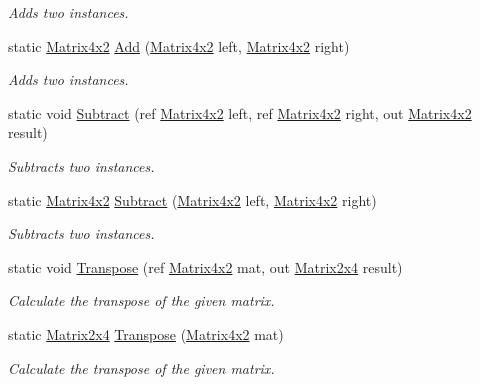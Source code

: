 \begin{DoxyCompactItemize}
\begin{DoxyCompactList}\small\item\em Adds two instances. \end{DoxyCompactList}\item 
static \hyperlink{struct_open_t_k_1_1_matrix4x2}{Matrix4x2} \hyperlink{struct_open_t_k_1_1_matrix4x2_a1446111d28a6e7fec022a92cfb93f389}{Add} (\hyperlink{struct_open_t_k_1_1_matrix4x2}{Matrix4x2} left, \hyperlink{struct_open_t_k_1_1_matrix4x2}{Matrix4x2} right)
\begin{DoxyCompactList}\small\item\em Adds two instances. \end{DoxyCompactList}\item 
static void \hyperlink{struct_open_t_k_1_1_matrix4x2_a610985af3ac0f9cb9de19e73329a9652}{Subtract} (ref \hyperlink{struct_open_t_k_1_1_matrix4x2}{Matrix4x2} left, ref \hyperlink{struct_open_t_k_1_1_matrix4x2}{Matrix4x2} right, out \hyperlink{struct_open_t_k_1_1_matrix4x2}{Matrix4x2} result)
\begin{DoxyCompactList}\small\item\em Subtracts two instances. \end{DoxyCompactList}\item 
static \hyperlink{struct_open_t_k_1_1_matrix4x2}{Matrix4x2} \hyperlink{struct_open_t_k_1_1_matrix4x2_a1581a8fdc27ee02a1b5acd84b2ae4aed}{Subtract} (\hyperlink{struct_open_t_k_1_1_matrix4x2}{Matrix4x2} left, \hyperlink{struct_open_t_k_1_1_matrix4x2}{Matrix4x2} right)
\begin{DoxyCompactList}\small\item\em Subtracts two instances. \end{DoxyCompactList}\item 
static void \hyperlink{struct_open_t_k_1_1_matrix4x2_a717eb801f56a7e5d4eb61f13644b6f56}{Transpose} (ref \hyperlink{struct_open_t_k_1_1_matrix4x2}{Matrix4x2} mat, out \hyperlink{struct_open_t_k_1_1_matrix2x4}{Matrix2x4} result)
\begin{DoxyCompactList}\small\item\em Calculate the transpose of the given matrix. \end{DoxyCompactList}\item 
static \hyperlink{struct_open_t_k_1_1_matrix2x4}{Matrix2x4} \hyperlink{struct_open_t_k_1_1_matrix4x2_aa4b15769953b4f5f77a5b2e8bc8d9035}{Transpose} (\hyperlink{struct_open_t_k_1_1_matrix4x2}{Matrix4x2} mat)
\begin{DoxyCompactList}\small\item\em Calculate the transpose of the given matrix. \end{DoxyCompactList}\item 

\end{DoxyCompactItemize}
